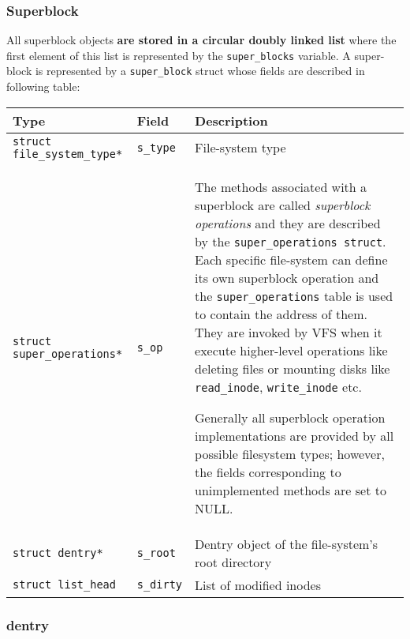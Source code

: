 \documentclass[10pt,a4paper]{article}
\begin{document}
\subsubsection{Superblock}

All superblock objects \textbf{are stored in a circular doubly linked list} where the first element of this list is represented by the \texttt{super\_blocks} variable. A super-block is represented by a \texttt{super\_block} struct whose fields are described in following table:

\begin{center}
\begin{tabular}{l|l|p{13cm}} 

\toprule
Type & Field & Description \\
\midrule

\texttt{struct file\_system\_type*} & \texttt{s\_type} & File-system type 

\\

\texttt{struct super\_operations*} & \texttt{s\_op} & The methods associated with a superblock are called \textit{superblock operations} and they are described by the \texttt{super\_operations struct}. Each specific file-system can define its own superblock operation and the \texttt{super\_operations} table is used to contain the address of them. They are invoked by VFS when it execute higher-level operations like deleting files or mounting disks like \texttt{read\_inode}, \texttt{write\_inode} etc.  

Generally all superblock operation implementations are provided by all possible filesystem types; however, the fields corresponding to unimplemented methods are set to NULL.

\\

\texttt{struct dentry*} & \texttt{s\_root} & Dentry object of the file-system's root directory 

\\

\texttt{struct list\_head} & \texttt{s\_dirty} & List of modified inodes 

\\
 
\bottomrule
\end{tabular}
\end{center}


\subsubsection{dentry}
\end{document}
